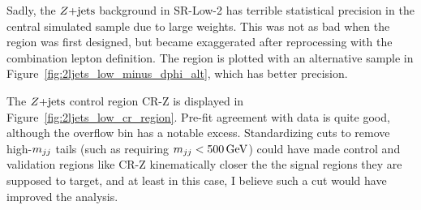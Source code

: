Sadly, the $\zjets$ background in SR-Low-2 has terrible statistical precision
in the central simulated sample due to large weights.
This was not as bad when the region was first designed, but became exaggerated
after reprocessing with the combination lepton definition.
The region is plotted with an alternative sample in
Figure~\ref{fig:2ljets_low_minus_dphi_alt}, which has better precision.

The $\zjets$ control region CR-Z is displayed in
Figure~\ref{fig:2ljets_low_cr_region}.
Pre-fit agreement with data is quite good, although the overflow bin has a
notable excess.
Standardizing cuts to remove high-$\mjj$ tails (such as requiring
$\mjj < 500\,\eV[G]$) could have made control and validation regions like CR-Z
kinematically closer the the signal regions they are supposed to target,
and at least in this case, I believe such a cut would have improved the
analysis.

